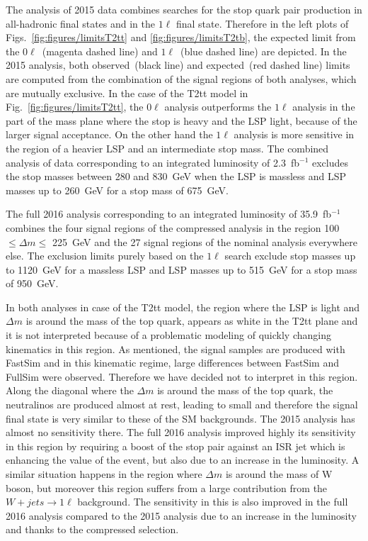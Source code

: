The analysis of 2015 data combines searches for the stop quark pair production in all-hadronic final states and in the $1\ell$ final state. Therefore in the left plots of Figs.~\ref{fig:figures/limitsT2tt} and \ref{fig:figures/limitsT2tb}, the expected limit from the $0\ell$~(magenta dashed line) and $1\ell$~(blue dashed line) are depicted. In the 2015 analysis, both observed~(black line) and expected~(red dashed line) limits are computed from the combination of the signal regions of both analyses, which are mutually exclusive. In the case of the T2tt model in Fig.~\ref{fig:figures/limitsT2tt}, the  $0\ell$ analysis outperforms the $1\ell$ analysis in the part of the mass plane where the stop is heavy and the LSP light, because of the larger signal acceptance. On the other hand the $1\ell$ analysis is more sensitive in the region of a heavier LSP and an intermediate stop mass. The combined analysis of data corresponding to an integrated luminosity of 2.3~fb$^{-1}$ excludes the stop masses between 280 and 830~GeV when the LSP is massless and LSP masses up to 260~GeV for a stop mass of 675~GeV. 

The full 2016 analysis corresponding to an integrated luminosity of 35.9~fb$^{-1}$ combines the four signal regions of the compressed analysis in the region 100 $\leq \Delta m \leq $ 225~GeV and the 27 signal regions of the nominal analysis everywhere else. The exclusion limits purely based on the $1\ell$ search exclude  stop masses up to 1120~GeV for a massless LSP and LSP masses up to 515~GeV for a stop mass of 950~GeV. 

In both analyses in case of the T2tt model, the region where the LSP is light and $\Delta m$ is around the mass of the top quark, appears as white in the T2tt plane and it is not interpreted because of a problematic modeling of quickly changing kinematics in this region. As mentioned, the signal samples are produced with FastSim and in this kinematic regime, large differences between FastSim and FullSim were observed. Therefore we have decided not to interpret in this region. Along the diagonal where the $\Delta m$ is around the mass of the top quark, the neutralinos are produced almost at rest, leading to  small \MET and therefore the signal final state is very similar to these of the SM backgrounds. The 2015 analysis has almost no sensitivity there. The full 2016 analysis improved highly its sensitivity in this region by requiring a boost of the stop pair against an ISR jet which is enhancing the \MET value of the event, but also due to an increase in the luminosity. A similar situation happens in the region where $\Delta m$ is around the mass of W boson, but moreover this region suffers from a  large contribution from the $W+jets \to 1\ell$ background. The sensitivity in this is also improved in the full 2016 analysis compared to the 2015 analysis due to an increase in the luminosity and  thanks to the compressed selection. 

